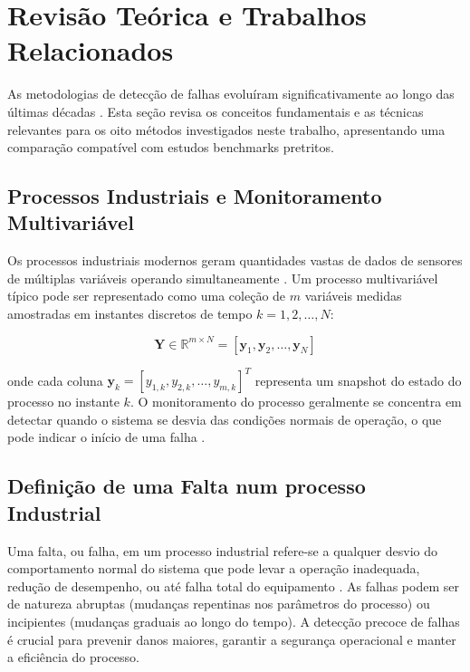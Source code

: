 \documentclass[journal]{IEEEtran}
\begin{document}
\section{Revisão Teórica e Trabalhos Relacionados}
\label{sec:theoretical}

As metodologias de detecção de falhas evoluíram significativamente ao longo das últimas décadas \cite{yin2012}. Esta seção revisa os conceitos fundamentais e as técnicas relevantes para os oito métodos investigados neste trabalho, apresentando uma comparação compatível com estudos benchmarks pretritos.

\subsection{Processos Industriais e Monitoramento Multivariável}
\label{subsec:industrial_processes}

Os processos industriais modernos geram quantidades vastas de dados de sensores de múltiplas variáveis operando simultaneamente \cite{yin2012}. Um processo multivariável típico pode ser representado como uma coleção de $m$ variáveis medidas amostradas em instantes discretos de tempo $k = 1, 2, \ldots, N$:

\begin{equation}
\mathbf{Y} \in \mathbb{R}^{m \times N} = [\mathbf{y}_1, \mathbf{y}_2, \ldots, \mathbf{y}_N]
\label{eq:process_data}
\end{equation}

onde cada coluna $\mathbf{y}_k = [y_{1,k}, y_{2,k}, \ldots, y_{m,k}]^T$ representa um snapshot do estado do processo no instante $k$. O monitoramento do processo geralmente se concentra em detectar quando o sistema se desvia das condições normais de operação, o que pode indicar o início de uma falha \cite{favoreel2000}.

\subsection{Definição de uma Falta num processo Industrial}
\label{subsec:fault_process}

Uma falta, ou falha, em um processo industrial refere-se a qualquer desvio do comportamento normal do sistema que pode levar a operação inadequada, redução de desempenho, ou até falha total do equipamento \cite{yin2012}. As falhas podem ser de natureza abruptas (mudanças repentinas nos parâmetros do processo) ou incipientes (mudanças graduais ao longo do tempo). A detecção precoce de falhas é crucial para prevenir danos maiores, garantir a segurança operacional e manter a eficiência do processo.
\end{document}
